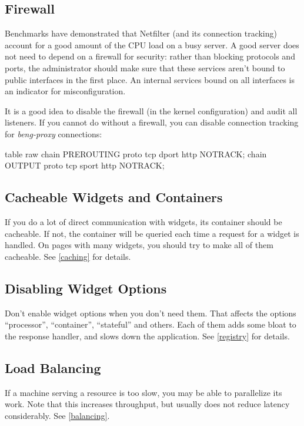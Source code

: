 \documentclass[a4paper,12pt]{article}
\begin{document}
\subsection{Firewall}

Benchmarks have demonstrated that Netfilter (and its connection
tracking) account for a good amount of the CPU load on a busy server.
A good server does not need to depend on a firewall for security:
rather than blocking protocols and ports, the administrator should
make sure that these services aren't bound to public interfaces in the
first place.  An internal services bound on all interfaces is an
indicator for misconfiguration.

It is a good idea to disable the firewall (in the kernel
configuration) and audit all listeners.  If you cannot do without a
firewall, you can disable connection tracking for \emph{beng-proxy}
connections:

\begin{verbatim*}
table raw {
  chain PREROUTING proto tcp dport http NOTRACK;
  chain OUTPUT proto tcp sport http NOTRACK;
}
\end{verbatim*}

\subsection{Cacheable Widgets and Containers}

If you do a lot of direct communication with widgets, its container
should be cacheable.  If not, the container will be queried each time
a request for a widget is handled.  On pages with many widgets, you
should try to make all of them cacheable.  See \ref{caching} for
details.

\subsection{Disabling Widget Options}

Don't enable widget options when you don't need them.  That affects
the options ``processor'', ``container'', ``stateful'' and others.
Each of them adds some bloat to the response handler, and slows down
the application.  See \ref{registry} for details.

\subsection{Load Balancing}

If a machine serving a resource is too slow, you may be able to
parallelize its work.  Note that this increases throughput, but
usually does not reduce latency considerably.  See \ref{balancing}.
\end{document}
